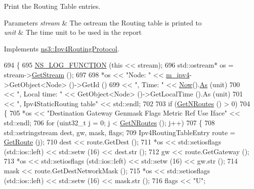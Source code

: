 Print the Routing Table entries. 


\begin{DoxyParams}{Parameters}
{\em stream} & The ostream the Routing table is printed to \\
\hline
{\em unit} & The time unit to be used in the report \\
\hline
\end{DoxyParams}


Implements \hyperlink{classns3_1_1Ipv4RoutingProtocol_a86ad3fc1d17b06b6553a13b03d7e8cb4}{ns3\+::\+Ipv4\+Routing\+Protocol}.


\begin{DoxyCode}
694 \{
695   \hyperlink{log-macros-disabled_8h_a90b90d5bad1f39cb1b64923ea94c0761}{NS\_LOG\_FUNCTION} (\textcolor{keyword}{this} << stream);
696   std::ostream* os = stream->\hyperlink{classns3_1_1OutputStreamWrapper_a0cf30a4188ab6fdae2b2ab74db11acc2}{GetStream} ();
697 
698   *os << \textcolor{stringliteral}{"Node: "} << \hyperlink{classns3_1_1Ipv4StaticRouting_adc30356be1824ea40ffbd444a5d91b9f}{m\_ipv4}->GetObject<Node> ()->GetId ()
699       << \textcolor{stringliteral}{", Time: "} << \hyperlink{group__simulator_gac3635e2e87f7ce316c89290ee1b01d0d}{Now}().\hyperlink{classns3_1_1Time_a0bb1110638ce9938248bd07865a328ab}{As} (unit)
700       << \textcolor{stringliteral}{", Local time: "} << GetObject<Node> ()->GetLocalTime ().As (unit)
701       << \textcolor{stringliteral}{", Ipv4StaticRouting table"} << std::endl;
702 
703   \textcolor{keywordflow}{if} (\hyperlink{classns3_1_1Ipv4StaticRouting_a074f780e02f4252e8daa59ed70f499ab}{GetNRoutes} () > 0)
704     \{
705       *os << \textcolor{stringliteral}{"Destination     Gateway         Genmask         Flags Metric Ref    Use Iface"} << std::endl;
706       \textcolor{keywordflow}{for} (uint32\_t j = 0; j < \hyperlink{classns3_1_1Ipv4StaticRouting_a074f780e02f4252e8daa59ed70f499ab}{GetNRoutes} (); j++)
707         \{
708           std::ostringstream dest, gw, mask, flags;
709           Ipv4RoutingTableEntry route = \hyperlink{classns3_1_1Ipv4StaticRouting_a2bd58c5ceeaff35b32a68826fbec5245}{GetRoute} (j);
710           dest << route.GetDest ();
711           *os << std::setiosflags (std::ios::left) << std::setw (16) << dest.str ();
712           gw << route.GetGateway ();
713           *os << std::setiosflags (std::ios::left) << std::setw (16) << gw.str ();
714           mask << route.GetDestNetworkMask ();
715           *os << std::setiosflags (std::ios::left) << std::setw (16) << mask.str ();
716           flags << \textcolor{stringliteral}{"U"};

\end{DoxyCode}
